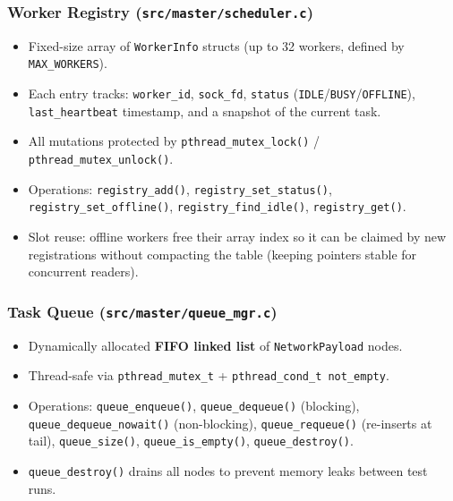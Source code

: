 \documentclass[12pt,a4paper]{article}
\begin{document}
\subsubsection{Worker Registry (\texttt{src/master/scheduler.c})}
\begin{itemize}[noitemsep]
    \item Fixed-size array of \texttt{WorkerInfo} structs (up to 32 workers, defined by \texttt{MAX\_WORKERS}).
    \item Each entry tracks: \texttt{worker\_id}, \texttt{sock\_fd}, \texttt{status} (\texttt{IDLE}/\texttt{BUSY}/\texttt{OFFLINE}), \texttt{last\_heartbeat} timestamp, and a snapshot of the current task.
    \item All mutations protected by \texttt{pthread\_mutex\_lock()} / \texttt{pthread\_mutex\_unlock()}.
    \item Operations: \texttt{registry\_add()}, \texttt{registry\_set\_status()}, \texttt{registry\_set\_offline()}, \texttt{registry\_find\_idle()}, \texttt{registry\_get()}.
    \item Slot reuse: offline workers free their array index so it can be claimed by new registrations without compacting the table (keeping pointers stable for concurrent readers).
\end{itemize}

\subsubsection{Task Queue (\texttt{src/master/queue\_mgr.c})}
\begin{itemize}[noitemsep]
    \item Dynamically allocated \textbf{FIFO linked list} of \texttt{NetworkPayload} nodes.
    \item Thread-safe via \texttt{pthread\_mutex\_t} + \texttt{pthread\_cond\_t not\_empty}.
    \item Operations: \texttt{queue\_enqueue()}, \texttt{queue\_dequeue()} (blocking), \texttt{queue\_dequeue\_nowait()} (non-blocking), \texttt{queue\_requeue()} (re-inserts at tail), \texttt{queue\_size()}, \texttt{queue\_is\_empty()}, \texttt{queue\_destroy()}.
    \item \texttt{queue\_destroy()} drains all nodes to prevent memory leaks between test runs.
\end{itemize}
\end{document}
